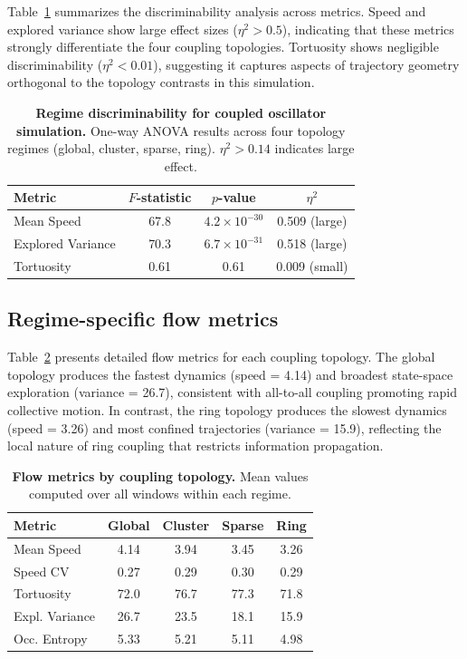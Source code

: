 \documentclass[5p,twocolumn,authoryear]{elsarticle}
\begin{document}
Table~\ref{tab:discriminability} summarizes the discriminability analysis across metrics. Speed and explored variance show large effect sizes ($\eta^2 > 0.5$), indicating that these metrics strongly differentiate the four coupling topologies. Tortuosity shows negligible discriminability ($\eta^2 < 0.01$), suggesting it captures aspects of trajectory geometry orthogonal to the topology contrasts in this simulation.

\begin{table}[h]
\centering
\caption{\textbf{Regime discriminability for coupled oscillator simulation.} One-way ANOVA results across four topology regimes (global, cluster, sparse, ring). $\eta^2 > 0.14$ indicates large effect.}
\label{tab:discriminability}
\small
\begin{tabular}{lccc}
\toprule
\textbf{Metric} & \textbf{$F$-statistic} & \textbf{$p$-value} & \textbf{$\eta^2$} \\
\midrule
Mean Speed & 67.8 & $4.2 \times 10^{-30}$ & 0.509 (large) \\
Explored Variance & 70.3 & $6.7 \times 10^{-31}$ & 0.518 (large) \\
Tortuosity & 0.61 & 0.61 & 0.009 (small) \\
\bottomrule
\end{tabular}
\end{table}

\subsection{Regime-specific flow metrics}

Table~\ref{tab:regime_metrics} presents detailed flow metrics for each coupling topology. The global topology produces the fastest dynamics (speed = 4.14) and broadest state-space exploration (variance = 26.7), consistent with all-to-all coupling promoting rapid collective motion. In contrast, the ring topology produces the slowest dynamics (speed = 3.26) and most confined trajectories (variance = 15.9), reflecting the local nature of ring coupling that restricts information propagation.

\begin{table}[h]
\centering
\caption{\textbf{Flow metrics by coupling topology.} Mean values computed over all windows within each regime.}
\label{tab:regime_metrics}
\small
\begin{tabular}{lcccc}
\toprule
\textbf{Metric} & \textbf{Global} & \textbf{Cluster} & \textbf{Sparse} & \textbf{Ring} \\
\midrule
Mean Speed & 4.14 & 3.94 & 3.45 & 3.26 \\
Speed CV & 0.27 & 0.29 & 0.30 & 0.29 \\
Tortuosity & 72.0 & 76.7 & 77.3 & 71.8 \\
Expl. Variance & 26.7 & 23.5 & 18.1 & 15.9 \\
Occ. Entropy & 5.33 & 5.21 & 5.11 & 4.98 \\
\bottomrule
\end{tabular}
\end{table}
\end{document}
